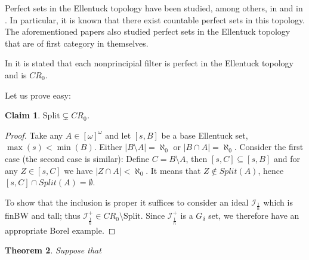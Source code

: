 \documentclass[12pt]{amsart}
\theoremstyle{plain}
\newtheorem{theorem}{Theorem}[section]
\newtheorem{claim}[theorem]{Claim}
\theoremstyle{definition}
\theoremstyle{remark}
\newcommand{\infsub}{[\omega]^{\omega}}
\newcommand{\cI}{\mathcal{I}}
\newcommand{\idealHarmoniczny}{\cI_{\frac{1}{n}}}
\newcommand{\Split}{\mathrm{Split}}
\begin{document}
Perfect sets in the Ellentuck topology have been studied,
among others, in \cite{Reardon1996} and in \cite{NowikReardon2003}.
In particular, it is known that there exist countable perfect sets in this topology.
The aforementioned papers also studied perfect sets in the Ellentuck topology
that are of first category in themselves.

In \cite{NowikReardon2003} it is stated that each nonprincipial filter is
perfect in the Ellentuck topology and is $CR_0$.

Let us prove easy:
\begin{claim}
  $\Split\subsetneq CR_0$.
\end{claim}
\begin{proof}
  Take any $A \in \infsub$ and let $[s, B]$ be a base Ellentuck set, $\max(s) < \min(B)$.
Either $|B \setminus A| = \aleph_0$ or $|B \cap A| = \aleph_0$.
Consider the first case (the second case is similar): Define $C = B \setminus A$, 
then $[s, C] \subseteq [s, B]$ and for any $Z \in [s, C]$ we have
$|Z \cap A| < \aleph_0$. It means that
$Z \not\in \mathit{Split}(A)$, hence $[s, C] \cap \mathit{Split}(A) = \emptyset$.

To show that the inclusion is proper it suffices to consider an ideal 
$\idealHarmoniczny$ which is finBW and tall; thus 
$\idealHarmoniczny^+ \in CR_0 \setminus \mathrm{Split}$. Since 
$\idealHarmoniczny^+$ is a $G_\delta$ set, we therefore have an appropriate Borel example.
\end{proof}

\begin{theorem}
Suppose that 
\end{theorem}

\printbibliography
\end{document}
